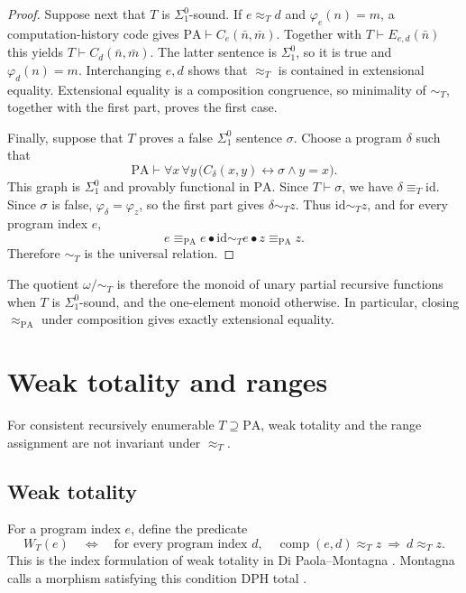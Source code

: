 \documentclass[11pt]{article}
\newcommand{\PA}{\mathrm{PA}}
\newcommand{\comp}{\operatorname{comp}}
\begin{document}
\begin{proof}
Suppose next that $T$ is $\Sigma^0_1$-sound. If $e\approx_Td$ and
$\varphi_e(n)=m$, a computation-history code gives
$\PA\vdash C_e(\bar n,\bar m)$. Together with
$T\vdash E_{e,d}(\bar n)$ this yields
$T\vdash C_d(\bar n,\bar m)$. The latter sentence is $\Sigma^0_1$,
so it is true and $\varphi_d(n)=m$. Interchanging $e,d$ shows that
$\approx_T$ is contained in extensional equality. Extensional equality
is a composition congruence, so minimality of $\sim_T$, together with
the first part, proves the first case.

Finally, suppose that $T$ proves a false $\Sigma^0_1$ sentence
$\sigma$. Choose a program $\delta$ such that
\[
 \PA\vdash\forall x\,\forall y\,
 \bigl(C_\delta(x,y)\longleftrightarrow\sigma\land y=x\bigr).
\]
This graph is $\Sigma^0_1$ and provably functional in $\PA$.
Since $T\vdash\sigma$, we have $\delta\equiv_T\mathrm{id}$.
Since $\sigma$ is false, $\varphi_\delta=\varphi_z$, so the first
part gives $\delta\sim_Tz$. Thus $\mathrm{id}\sim_Tz$, and for
every program index $e$,
\[
 e\equiv_{\PA}e\bullet\mathrm{id}
   \sim_Te\bullet z\equiv_{\PA}z.
\]
Therefore $\sim_T$ is the universal relation.
\end{proof}

The quotient $\omega/{\sim_T}$ is therefore the monoid of unary partial
recursive functions when $T$
is $\Sigma^0_1$-sound, and the one-element monoid otherwise.
In particular, closing $\approx_{\PA}$ under composition gives exactly
extensional equality.

\section{Weak totality and ranges}\label{sec:applications}

For consistent recursively enumerable $T\supseteq\PA$, weak totality
and the range assignment are not invariant under $\approx_T$.

\subsection{Weak totality}

For a program index $e$, define the predicate
\begin{equation}\label{eq:weak}
 W_T(e)\quad\Longleftrightarrow\quad
 \text{for every program index }d,\quad
 \comp(e,d)\approx_Tz\ \Longrightarrow\ d\approx_Tz.
\end{equation}
This is the index formulation of weak totality in Di Paola--Montagna
\cite[Definition~1.5, p.~645]{DiPaolaMontagna}. Montagna calls a morphism
satisfying this condition DPH total \cite[Definition~1.1, p.~106]{Montagna}.
\end{document}
